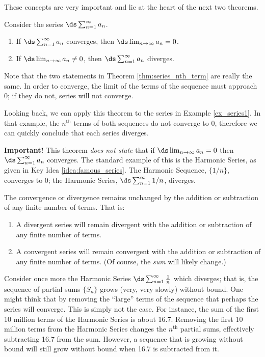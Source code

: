 These concepts are very important and lie at the heart of the next two theorems.

{Consider the series $\ds\sum_{n=1}^\infty a_n$. 
\begin{enumerate}
\item		If $\ds\sum_{n=1}^\infty a_n$ converges, then $\ds \lim_{n\to\infty}a_n =0$.
\item		If $\ds \lim_{n\to\infty}a_n \neq 0$, then $\ds\sum_{n=1}^\infty a_n$ diverges.
\end{enumerate}
}

Note that the two statements in Theorem \ref{thm:series_nth_term} are really the same. In order to converge, the limit of the terms of the sequence must approach 0; if they do not, series will not converge. 

Looking back, we can apply this theorem to the series in Example \ref{ex_series1}. In that example, the $n^\text{th}$ terms of both sequences do not converge to 0, therefore we can quickly conclude that each series diverges.

\textbf{Important!} This theorem \emph{does not state} that if $\ds \lim_{n\to\infty} a_n = 0$ then $\ds \sum_{n=1}^\infty  a_n $ converges. The standard example of this is the Harmonic Series, as given in Key Idea \ref{idea:famous_series}. The Harmonic Sequence, $\{1/n\}$, converges to 0; the Harmonic Series, $\ds \sum_{n=1}^\infty 1/n$, diverges.

{The convergence or divergence remains unchanged by the addition or subtraction of any finite number of terms. That is:
	\begin{enumerate}
	\item		A divergent series will remain divergent with the addition or subtraction of any finite number of terms.
	\item		A convergent series will remain convergent with the addition or subtraction of any finite number of terms. (Of course, the \emph{sum} will likely change.)
	\end{enumerate}
}

Consider once more the Harmonic Series $\ds\sum_{n=1}^\infty  \frac1n$ which diverges; that is, the sequence of partial sums $\{S_n\}$ grows (very, very slowly) without bound. One might think that by removing the ``large'' terms of the sequence that perhaps the series will converge. This is simply not the case. For instance, the sum of the first 10 million terms of the Harmonic Series is about 16.7. Removing the first 10 million terms from the Harmonic Series changes the $n^\text{th}$ partial sums,  effectively subtracting 16.7 from the sum. However, a sequence that is growing without bound will still grow without bound when 16.7 is subtracted from it. 

